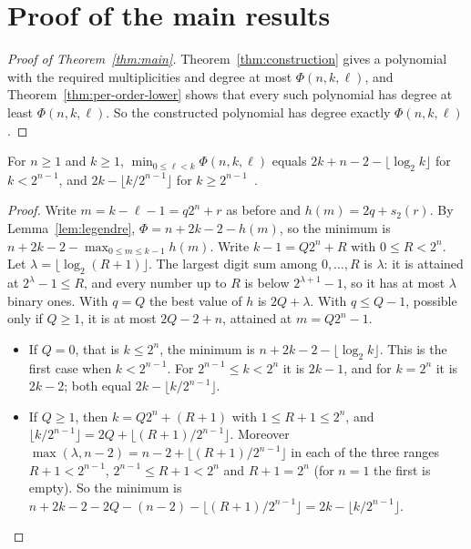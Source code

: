 \section{Proof of the main results}\label{sec:main}

\begin{proof}[Proof of Theorem~\ref{thm:main}]
Theorem~\ref{thm:construction} gives a polynomial with the required
multiplicities and degree at most \(\Phi(n,k,\ell)\), and
Theorem~\ref{thm:per-order-lower} shows that every such polynomial has degree at
least \(\Phi(n,k,\ell)\). So the constructed polynomial has degree exactly
\(\Phi(n,k,\ell)\).
\end{proof}

\begin{lemma}\label{lem:minimum}
For \(n\ge1\) and \(k\ge1\), \(\min_{0\le\ell<k}\Phi(n,k,\ell)\) equals
\(2k+n-2-\lfloor\log_2k\rfloor\) for \(k<2^{n-1}\), and
\(2k-\lfloor k/2^{n-1}\rfloor\) for \(k\ge2^{n-1}\)
\textnormal{\small{}\,}.
\end{lemma}

\begin{proof}
Write \(m=k-\ell-1=q2^n+r\) as before and \(h(m)=2q+s_2(r)\). By
Lemma~\ref{lem:legendre}, \(\Phi=n+2k-2-h(m)\), so the minimum is
\(n+2k-2-\max_{0\le m\le k-1}h(m)\). Write \(k-1=Q2^n+R\) with \(0\le R<2^n\).
Let \(\lambda=\lfloor\log_2(R+1)\rfloor\). The largest digit sum among
\(0,\ldots,R\) is \(\lambda\): it is attained at \(2^\lambda-1\le R\), and every
number up to \(R\) is below \(2^{\lambda+1}-1\), so it has at most \(\lambda\)
binary ones. With \(q=Q\) the best value of \(h\) is \(2Q+\lambda\). With
\(q\le Q-1\), possible only if \(Q\ge1\), it is at most \(2Q-2+n\), attained at
\(m=Q2^n-1\).
\begin{itemize}
 \item If \(Q=0\), that is \(k\le2^n\), the minimum is
 \(n+2k-2-\lfloor\log_2k\rfloor\). This is the first case when \(k<2^{n-1}\). For
 \(2^{n-1}\le k<2^n\) it is \(2k-1\), and for \(k=2^n\) it is \(2k-2\); both equal
 \(2k-\lfloor k/2^{n-1}\rfloor\).
 \item If \(Q\ge1\), then \(k=Q2^n+(R+1)\) with \(1\le R+1\le2^n\), and
 \(\lfloor k/2^{n-1}\rfloor=2Q+\lfloor(R+1)/2^{n-1}\rfloor\). Moreover
 \(\max(\lambda,n-2)=n-2+\lfloor(R+1)/2^{n-1}\rfloor\) in each of
 the three ranges \(R+1<2^{n-1}\), \(2^{n-1}\le R+1<2^n\) and \(R+1=2^n\) (for
 \(n=1\) the first is empty). So the minimum is
 \(n+2k-2-2Q-(n-2)-\lfloor(R+1)/2^{n-1}\rfloor=2k-\lfloor k/2^{n-1}\rfloor\). \qedhere
\end{itemize}
\end{proof}

